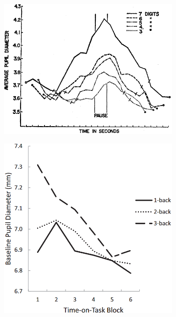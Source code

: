 \begin{figure}[h]
    \begin{subfigure}[b]{0.5\textwidth}
        \centering
        \includegraphics[width=\textwidth]{figures/bt_kahneman1966.png}
        \vspace{0.5mm}
        \caption{}
        \label{fig:bt/pupillary_expA}
    \end{subfigure}
    \begin{subfigure}[b]{0.5\textwidth}
        \centering
        \includegraphics[width=\textwidth]{figures/bt_hopstaken2015.png}

\end{subfigure}
\end{figure}
